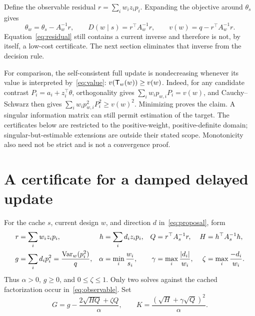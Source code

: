 \documentclass[11pt]{article}
\begin{document}
Define the observable residual $r=\sum_iw_iz_ip_i$.
Expanding the objective around $\theta_s$ gives
\begin{equation}\label{eq:residual}
 \theta_w=\theta_s-A_w^{-1}r,\qquad
 D(w\mid s)=r^\top A_w^{-1}r,\qquad
 v(w)=q-r^\top A_w^{-1}r.
\end{equation}
Equation~\eqref{eq:residual} still contains a current inverse and therefore is not, by itself, a low-cost certificate.
The next section eliminates that inverse from the decision rule.

For comparison, the self-consistent full update is nondecreasing whenever its value is interpreted by~\eqref{eq:value}:
$v(\mathsf T_w(w))\ge v(w)$.
Indeed, for any candidate contrast $P_i=a_i+z_i^\top\theta$, orthogonality gives
$\sum_iw_ip_{w,i}P_i=v(w)$, and Cauchy--Schwarz then gives
$\sum_iw_ip_{w,i}^2P_i^2\ge v(w)^2$.
Minimizing proves the claim.
A singular information matrix can still permit estimation of the target. The certificates below are restricted to the positive-weight, positive-definite domain; singular-but-estimable extensions are outside their stated scope.
Monotonicity also need not be strict and is not a convergence proof.

\section{A certificate for a damped delayed update}
For the cache $s$, current design $w$, and direction $d$ in~\eqref{eq:proposal}, form
\begin{align}
 r&=\sum_iw_iz_ip_i,& h&=\sum_id_iz_ip_i,&
 Q&=r^\top A_s^{-1}r,& H&=h^\top A_s^{-1}h,\label{eq:observable}\\
 g&=\sum_id_ip_i^2=\frac{\operatorname{Var}_w(p_i^2)}q,&
 \alpha&=\min_i\frac{w_i}{s_i},&
 \gamma&=\max_i\frac{|d_i|}{w_i},&
 \zeta&=\max_i\frac{-d_i}{w_i}.\label{eq:scalars}
\end{align}
Thus $\alpha>0$, $g\ge0$, and $0\le\zeta\le1$.
Only two solves against the cached factorization occur in~\eqref{eq:observable}.
Set
\begin{equation}\label{eq:GK}
 G=g-\frac{2\sqrt{HQ}+\zeta Q}{\alpha},\qquad
 K=\frac{(\sqrt H+\gamma\sqrt Q)^2}{\alpha}.
\end{equation}
\end{document}
